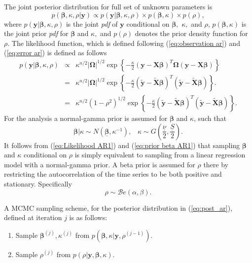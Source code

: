 \documentclass[article]{jss}
\begin{document}
The joint posterior distribution for full set of unknown parameters
is
\begin{equation} p(\bm{\beta},\kappa,\rho|\bm{y})\propto
  p(\bm{y}|\bm{\beta},\kappa,\rho)\times p(\bm{\beta},\kappa)\times
  p(\rho),\label{eq:post_ar}
\end{equation} where
$p(\bm{y}|\bm{\beta},\kappa,\rho)$ is the joint \emph{pdf} of $\bm{y}$
conditional on $\bm{\beta},$ $\kappa,$ and $\rho$,
$p(\bm{\beta},\kappa)$ is the joint prior \emph{pdf} for $\bm{\beta}$
and $\kappa,$ and $p(\rho)$ denotes the prior density function for
$\rho.$ The likelihood function, which is defined following
(\ref{eq:observation ar}) and (\ref{eq:error ar}) is defined as
follows
\begin{eqnarray}
  p(\bm{y}|\bm{\beta},\kappa,\rho) & \propto & \kappa^{n/2}|\bm{\Omega}|^{1/2}\exp\left\{ -\frac{\kappa}{2}\left(\bm{y}-\bm{X}\bm{\beta}\right)^{T}\bm{\Omega}\left(\bm{y}-\bm{X}\bm{\beta}\right)\right\} \nonumber \\
  & = & \kappa^{n/2}|\bm{\Omega}|^{1/2}\exp\left\{ -\frac{\kappa}{2}\left(\tilde{\bm{y}}-\tilde{\bm{X}}\bm{\beta}\right)^{T}\left(\tilde{\bm{y}}-\tilde{\bm{X}}\bm{\beta}\right)\right\} .\nonumber \\
  & = & \kappa^{n/2}\left(1-\rho^{2}\right)^{1/2}\exp\left\{
    -\frac{\kappa}{2}\left(\tilde{\bm{y}}-\tilde{\bm{X}}\bm{\beta}\right)^{T}\left(\tilde{\bm{y}}-\tilde{\bm{X}}\bm{\beta}\right)\right\}
  .
  \label{eq:Likelihood AR1}
\end{eqnarray} 
For the analysis a normal-gamma prior is assumed for $\bm{\beta}$ and
$\kappa$, such that
\begin{equation} \bm{\beta}|\kappa\sim
  N\left(\underline{\bm{\beta}},\kappa^{-1}\right),\,\,\,\,\,\kappa\sim
  G\left(\frac{\underline{\nu}}{2},\frac{\underline{S}}{2}\right).
  \label{eq:prior
    beta AR1}
\end{equation} It follows from (\ref{eq:Likelihood AR1})
and (\ref{eq:prior beta AR1}) that sampling $\bm{\beta}$ and $\kappa$
conditional on $\rho$ is simply equivalent to sampling from a linear
regression model with a normal-gamma prior. A beta prior is assumed
for $\rho$ there by restricting the autocorrelation of the time series
to be both positive and stationary. Specifically\[
\rho\sim\mathcal{B}e\left(\alpha,\beta\right).\]

A MCMC sampling scheme, for the posterior distribution in
(\ref{eq:post_ar}), defined at iteration $j$ is as follows:
\begin{enumerate}
\item Sample $\bm{\beta}^{(j)},\kappa^{(j)}$ from
  $p(\bm{\beta},\kappa|\bm{y},\rho^{(j-1)}).$
\item Sample $\rho^{(j)}$ from $p(\rho|\bm{y},\bm{\beta},\kappa).$
\end{enumerate}
\end{document}
